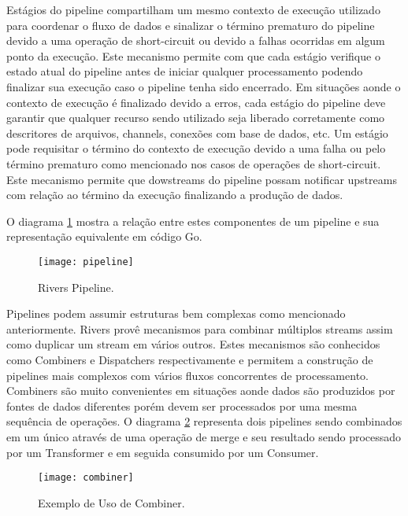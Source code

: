 Estágios do pipeline compartilham um mesmo contexto de execução utilizado para coordenar o fluxo de dados e sinalizar o término prematuro do pipeline devido a uma operação de short-circuit \cite{article:wikipedia:short_circuit_evaluation} ou devido a falhas ocorridas em algum ponto da execução. Este mecanismo permite com que cada estágio verifique o estado atual do pipeline antes de iniciar qualquer processamento podendo finalizar sua execução caso o pipeline tenha sido encerrado. Em situações aonde o contexto de execução é finalizado devido a erros, cada estágio do pipeline deve garantir que qualquer recurso sendo utilizado seja liberado corretamente como descritores de arquivos, channels, conexões com base de dados, etc. Um estágio pode requisitar o término do contexto de execução devido a uma falha ou pelo término prematuro como mencionado nos casos de operações de short-circuit. Este mecanismo permite que dowstreams do pipeline possam notificar upstreams com relação ao término da execução finalizando a produção de dados.

O diagrama \ref{fig:rivers:pipeline} mostra a relação entre estes componentes de um pipeline e sua representação equivalente em código Go.

\begin{figure}[H]
  \texttt{[image: pipeline]}
  \centering
  \caption{Rivers Pipeline.}
  \label{fig:rivers:pipeline}
\end{figure}

Pipelines podem assumir estruturas bem complexas como mencionado anteriormente. Rivers provê mecanismos para combinar múltiplos streams assim como duplicar um stream em vários outros. Estes mecanismos são conhecidos como Combiners e Dispatchers respectivamente e permitem a construção de pipelines mais complexos com vários fluxos concorrentes de processamento. Combiners são muito convenientes em situações aonde dados são produzidos por fontes de dados diferentes porém devem ser processados por uma mesma sequência de operações. O diagrama \ref{fig:rivers:combiner} representa dois pipelines sendo combinados em um único através de uma operação de merge e seu resultado sendo processado por um Transformer e em seguida consumido por um Consumer.

\begin{figure}[H]
  \texttt{[image: combiner]}
  \centering
  \caption{Exemplo de Uso de Combiner.}
  \label{fig:rivers:combiner}
\end{figure}

